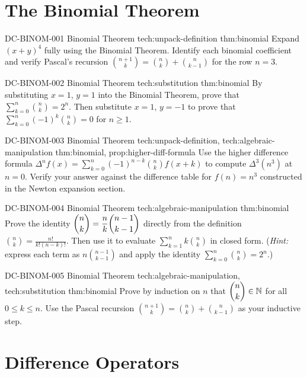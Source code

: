 \section*{The Binomial Theorem}

\exstubgenfull
  {DC-BINOM-001}
  {Binomial Theorem}
  {tech:unpack-definition}
  {thm:binomial}
  {Expand \((x+y)^4\) fully using the Binomial Theorem. Identify each
  binomial coefficient and verify Pascal's recursion
  \(\binom{n+1}{k} = \binom{n}{k} + \binom{n}{k-1}\) for the row \(n=3\).}

\exstubgenfull
  {DC-BINOM-002}
  {Binomial Theorem}
  {tech:substitution}
  {thm:binomial}
  {By substituting \(x = 1\), \(y = 1\) into the Binomial Theorem, prove
  that \(\displaystyle\sum_{k=0}^{n}\binom{n}{k} = 2^n\). Then substitute
  \(x = 1\), \(y = -1\) to prove that \(\displaystyle\sum_{k=0}^{n}(-1)^k\binom{n}{k} = 0\)
  for \(n \ge 1\).}

\exstubgenfull
  {DC-BINOM-003}
  {Binomial Theorem}
  {tech:unpack-definition, tech:algebraic-manipulation}
  {thm:binomial, prop:higher-diff-formula}
  {Use the higher difference formula
  \(\Delta^n f(x) = \displaystyle\sum_{k=0}^{n}(-1)^{n-k}\binom{n}{k}f(x+k)\)
  to compute \(\Delta^3(n^3)\) at \(n = 0\). Verify your answer against
  the difference table for \(f(n) = n^3\) constructed in the Newton
  expansion section.}

\exstubgenfull
  {DC-BINOM-004}
  {Binomial Theorem}
  {tech:algebraic-manipulation}
  {thm:binomial}
  {Prove the identity \(\dbinom{n}{k} = \dfrac{n}{k}\dbinom{n-1}{k-1}\)
  directly from the definition \(\binom{n}{k} = \frac{n!}{k!(n-k)!}\).
  Then use it to evaluate \(\displaystyle\sum_{k=1}^{n} k\binom{n}{k}\)
  in closed form. (\emph{Hint:} express each term as \(n\binom{n-1}{k-1}\)
  and apply the identity \(\sum_{k=0}^{n}\binom{n}{k} = 2^n\).)}

\exstubgenfull
  {DC-BINOM-005}
  {Binomial Theorem}
  {tech:algebraic-manipulation, tech:substitution}
  {thm:binomial}
  {Prove by induction on \(n\) that \(\dbinom{n}{k} \in \mathbb{N}\)
  for all \(0 \le k \le n\). Use the Pascal recursion
  \(\binom{n+1}{k} = \binom{n}{k} + \binom{n}{k-1}\) as your
  inductive step.}

\section*{Difference Operators}

